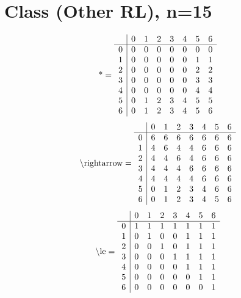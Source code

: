 \documentclass[11pt]{article}
\begin{document}
\section{Class (Other RL), n=15}
\[\text{*} = 
\begin{array}{r | r r r r r r r}
 & 0 & 1 & 2 & 3 & 4 & 5 & 6 \\ \hline
0 & 0 & 0 & 0 & 0 & 0 & 0 & 0 \\
1 & 0 & 0 & 0 & 0 & 0 & 1 & 1 \\
2 & 0 & 0 & 0 & 0 & 0 & 2 & 2 \\
3 & 0 & 0 & 0 & 0 & 0 & 3 & 3 \\
4 & 0 & 0 & 0 & 0 & 0 & 4 & 4 \\
5 & 0 & 1 & 2 & 3 & 4 & 5 & 5 \\
6 & 0 & 1 & 2 & 3 & 4 & 5 & 6 \\
\end{array}
\]
\[\text{\textbackslash rightarrow} = 
\begin{array}{r | r r r r r r r}
 & 0 & 1 & 2 & 3 & 4 & 5 & 6 \\ \hline
0 & 6 & 6 & 6 & 6 & 6 & 6 & 6 \\
1 & 4 & 6 & 4 & 4 & 6 & 6 & 6 \\
2 & 4 & 4 & 6 & 4 & 6 & 6 & 6 \\
3 & 4 & 4 & 4 & 6 & 6 & 6 & 6 \\
4 & 4 & 4 & 4 & 4 & 6 & 6 & 6 \\
5 & 0 & 1 & 2 & 3 & 4 & 6 & 6 \\
6 & 0 & 1 & 2 & 3 & 4 & 5 & 6 \\
\end{array}
\]
\[\text{\textbackslash le} = 
\begin{array}{r | r r r r r r r}
 & 0 & 1 & 2 & 3 & 4 & 5 & 6 \\ \hline
0 & 1 & 1 & 1 & 1 & 1 & 1 & 1 \\
1 & 0 & 1 & 0 & 0 & 1 & 1 & 1 \\
2 & 0 & 0 & 1 & 0 & 1 & 1 & 1 \\
3 & 0 & 0 & 0 & 1 & 1 & 1 & 1 \\
4 & 0 & 0 & 0 & 0 & 1 & 1 & 1 \\
5 & 0 & 0 & 0 & 0 & 0 & 1 & 1 \\
6 & 0 & 0 & 0 & 0 & 0 & 0 & 1 \\
\end{array}
\]
\end{document}
